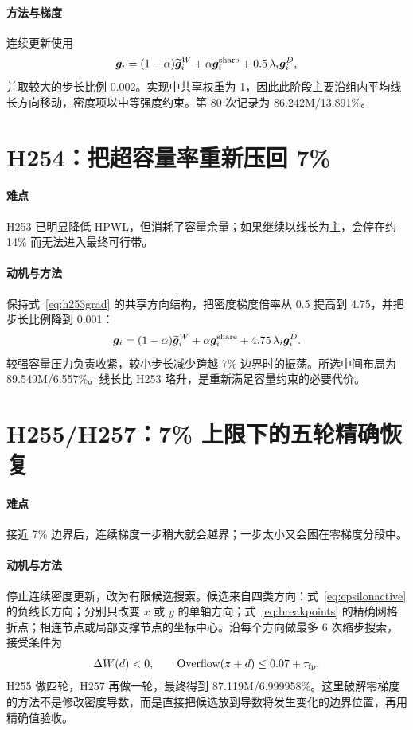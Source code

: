 \documentclass[UTF8,a4paper,11pt]{ctexrep}
\newcommand{\Overflow}{\operatorname{Overflow}}
\begin{document}
\paragraph{方法与梯度}
连续更新使用
\begin{equation}
 \bm g_i=(1-\alpha)\widetilde{\bm g}_i^W+\alpha\bm g_i^{\rm share}
 +0.5\,\lambda_i\bm g_i^D, \label{eq:h253grad}
\end{equation}
并取较大的步长比例 0.002。实现中共享权重为 1，因此此阶段主要沿组内平均线长方向移动，密度项以中等强度约束。第 80 次记录为 86.242M/13.891\%。

\section{H254：把超容量率重新压回 7\%}
\paragraph{难点}
H253 已明显降低 HPWL，但消耗了容量余量；如果继续以线长为主，会停在约 14\% 而无法进入最终可行带。

\paragraph{动机与方法}
保持式~\eqref{eq:h253grad} 的共享方向结构，把密度梯度倍率从 0.5 提高到 4.75，并把步长比例降到 0.001：
\begin{equation}
 \bm g_i=(1-\alpha)\widetilde{\bm g}_i^W+\alpha\bm g_i^{\rm share}
 +4.75\,\lambda_i\bm g_i^D. \label{eq:h254grad}
\end{equation}
较强容量压力负责收紧，较小步长减少跨越 7\% 边界时的振荡。所选中间布局为 89.549M/6.557\%。线长比 H253 略升，是重新满足容量约束的必要代价。

\section{H255/H257：7\% 上限下的五轮精确恢复}
\paragraph{难点}
接近 7\% 边界后，连续梯度一步稍大就会越界；一步太小又会困在零梯度分段中。

\paragraph{动机与方法}
停止连续密度更新，改为有限候选搜索。候选来自四类方向：式~\eqref{eq:epsilonactive} 的负线长方向；分别只改变 $x$ 或 $y$ 的单轴方向；式~\eqref{eq:breakpoints} 的精确网格折点；相连节点或局部支撑节点的坐标中心。沿每个方向做最多 6 次缩步搜索，接受条件为
\begin{equation}
 \Delta W(d)<0,\qquad \Overflow(\bm z+d)\le0.07+\tau_{\rm fp}. \label{eq:cap7}
\end{equation}
H255 做四轮，H257 再做一轮，最终得到 87.119M/6.999958\%。这里破解零梯度的方法不是修改密度导数，而是直接把候选放到导数将发生变化的边界位置，再用精确值验收。
\end{document}
